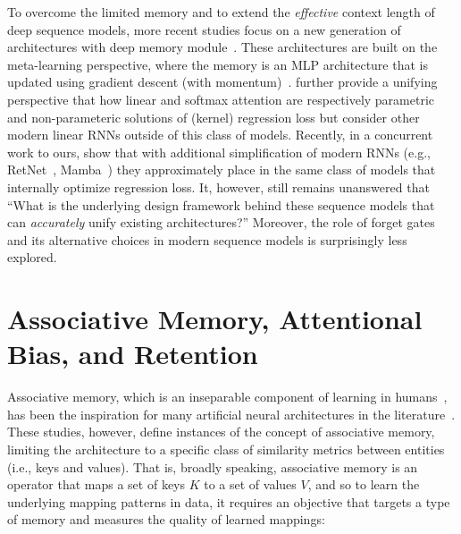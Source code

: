 \documentclass{article}
\newcommand{\citep}{\parencite}
\newcommand{\citet}{\textcite}
\theoremstyle{plain}
\theoremstyle{definition}
\theoremstyle{remark}
\newcommand{\head}[1]{\vspace{1.7mm}\noindent{{\textcolor{c2}{\bf #1.}}}}
\begin{document}
\head{Deep Memory Module: Titans and Test Time Training}
To overcome the limited memory and to extend the \emph{effective} context length of deep sequence models, more recent studies focus on a new generation of architectures with deep memory module~\citep{behrouz2024titans, sun2024learning}. These architectures are built on the meta-learning perspective, where the memory is an MLP architecture that is updated using gradient descent (with momentum)~\citep{behrouz2024titans, sun2024learning}. \citet{sun2024learning} further provide a unifying perspective that how linear and softmax attention are respectively parametric and non-parameteric solutions of (kernel) regression loss but consider other modern linear RNNs outside of this class of models. Recently, in a concurrent work to ours, \citet{wang2025test} show that with additional simplification of modern RNNs (e.g., RetNet~\citep{sun2023retentive}, Mamba~\citep{dao2024transformers}) they approximately place in the same class of models that internally optimize regression loss. It, however, still remains unanswered that ``What is the underlying design framework behind these sequence models that can \emph{accurately} unify existing architectures?'' Moreover, the role of forget gates and its alternative choices in modern sequence models is surprisingly less explored.  

\section{Associative Memory, Attentional Bias, and Retention} \label{sec:AM}
Associative memory, which is an inseparable component of learning in humans~\citep{terry2017learning}, has been the inspiration for many artificial neural architectures in the literature~\citep{hopfield1982neural, neil2017delta, behrouz2024titans}. These studies, however, define instances of the concept of associative memory, limiting the architecture to a specific class of similarity metrics between entities (i.e., keys and values). That is, broadly speaking, associative memory is an operator that maps a set of keys $K$ to a set of values $V$, and so to learn the underlying mapping patterns in data, it requires an objective that targets a type of memory and measures the quality of learned mappings:
\end{document}
